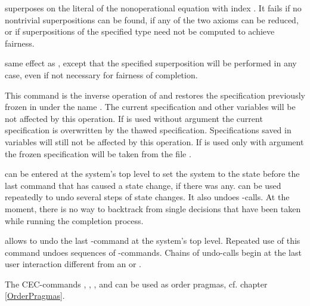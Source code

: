 \begin{command}
superposes  on the literal  of the 
nonoperational equation with index .
It fails if no nontrivial superpositions can be found, if
any of the two axioms can be reduced, or if
superpositions of the specified type need not be computed to achieve 
fairness.
\end{command}

\begin{command}
same effect as , except that the specified superposition
will be performed in any case, even if not necessary for fairness of
completion.
\end{command}

\begin{command}
This command is the inverse operation of  and restores the specification
previously frozen in 
under the name . The current specification and other variables 
will be not affected by this operation.
If  is used without argument  
the current specification is overwritten by the thawed specification. 
Specifications saved in variables will still not be affected by this operation.
If  is used only with argument  the frozen 
specification will be taken from the file .
\end{command}

\begin{command}
can be entered at the system's top level to set the system to the state
before the last command that has caused a state change, if there was
any.  can be used repeatedly to undo several steps of state changes.
It also undoes -calls. At the moment, there is no way to backtrack
from single decisions that have been taken while running the completion
process.
\end{command}

\begin{command}
allows to undo the last -command at the system's top level. Repeated use of
this command undoes sequences of -commands. Chains of undo-calls begin at 
the last user interaction different from an  or .
\end{command}

\noindent 
The CEC-commands , , , 
 and  can be used as 
order pragmas, cf. chapter \ref{OrderPragmas}.
